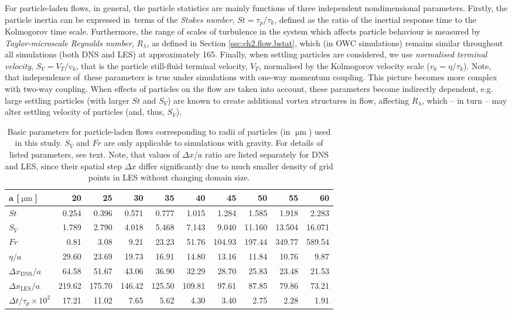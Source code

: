 \documentclass{pracamgren}
\begin{document}
For particle-laden flows, in general, the particle statistics are mainly functions of three independent nondimensional parameters.
Firstly, the particle inertia can be expressed in~terms of the \emph{Stokes number}, $St = \tau_p / \tau_k$, defined as the ratio of the inertial response time to the
Kolmogorov time scale.
Furthermore, the range of scales of turbulence in the system which affects particle behaviour is measured by \emph{Taylor-microscale Reynolds number}, $R_{\lambda}$, as defined in Section \ref{ssc:ch2.flow.bstat}, which (in OWC simulations) remains similar throughout all simulations (both DNS and LES) at approximately 165.
Finally, when settling particles are considered, we use \emph{normalised terminal velocity}, $S_V = V_T / v_k$, that is the particle still-fluid terminal velocity, $V_T$, normalised by the Kolmogorov velocity scale ($v_k = \eta / \tau_k$).
Note, that independence of~these parameters is true under simulations with one-way momentum coupling.
This picture becomes more complex with two-way coupling.
When effects of particles on the flow are taken into account, these parameters become indirectly dependent, e.g. large settling particles (with larger $St$ and $S_V$) are known to create additional vortex structures in flow, affecting $R_{\lambda}$, which -- in turn -- may alter settling velocity of particles (and, thus, $S_V$).

\begin{table}[h]
\centering
\small
\begin{tabular}{lrrrrrrrrr}
$\mathbf{a}$ [$\upmu\text{m}$] & 20 & 25 & 30 & 35 & 40 & 45 & 50 & 55 & 60  \\ \hline
$St$ & 0.254 & 0.396 & 0.571 & 0.777 & 1.015 & 1.284 & 1.585 & 1.918 & 2.283 \\
$S_V$ & 1.789 & 2.790 & 4.018 & 5.468 & 7.143 & 9.040 & 11.160 & 13.504 & 16.071 \\
$Fr$ & 0.81 & 3.08 & 9.21 & 23.23 & 51.76 & 104.93 & 197.44 & 349.77 & 589.54 \\
$\eta / a$ & 29.60 & 23.69 & 19.73 & 16.91 & 14.80 & 13.16 & 11.84 & 10.76 & 9.87 \\
$\Delta x_{\text{DNS}} / a$ & 64.58 & 51.67 & 43.06 & 36.90 & 32.29 & 28.70 & 25.83 & 23.48 & 21.53 \\
$\Delta x_{\text{LES}} / a$ & 219.62 & 175.70 & 146.42 & 125.50 & 109.81 & 97.61 & 87.85 & 79.86 & 73.21 \\
$\Delta t / \tau_p \times 10^2$ & 17.21 & 11.02 & 7.65 & 5.62 & 4.30 & 3.40 & 2.75 & 2.28 & 1.91 \\ \hline
\end{tabular}
\caption{Basic parameters for particle-laden flows corresponding to radii of particles (in $\upmu\text{m}$) used in this study.
$S_V$ and $Fr$ are only applicable to simulations with gravity.
For details of listed parameters, see text.
Note, that values of $\Delta x / a$ ratio are listed separately for DNS and LES, since their spatial step $\Delta x$ differ significantly due to much smaller density of grid points in LES without changing domain size. }
\label{tab:part-stats}
\end{table}
\end{document}
